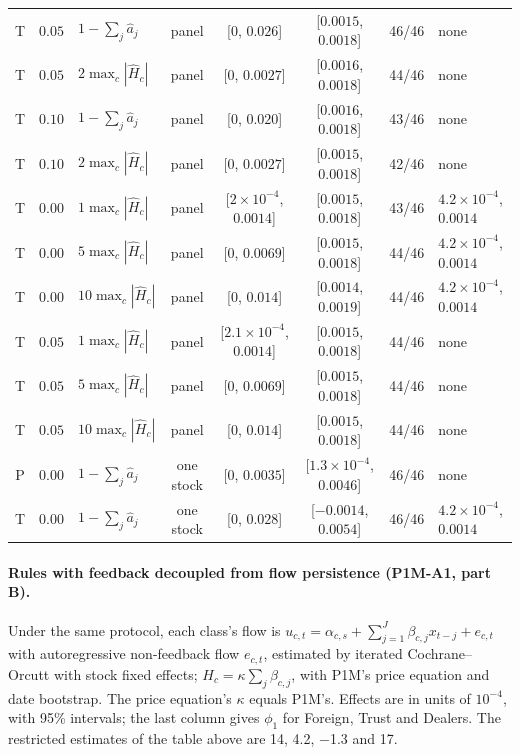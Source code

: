 \documentclass[12pt]{article}
\theoremstyle{definition}
\theoremstyle{remark}
\begin{document}
\begin{center}
\begin{tabular}{cclcccc>{\raggedright\arraybackslash}p{}}
T & $0.05$ & $1-\sum_j\hat a_j$ & panel & [$0$, $0.026$] & [$0.0015$, $0.0018$] & 46/46 & none\\
T & $0.05$ & $2\max_c|\hat H_c|$ & panel & [$0$, $0.0027$] & [$0.0016$, $0.0018$] & 44/46 & none\\
T & $0.10$ & $1-\sum_j\hat a_j$ & panel & [$0$, $0.020$] & [$0.0016$, $0.0018$] & 43/46 & none\\
T & $0.10$ & $2\max_c|\hat H_c|$ & panel & [$0$, $0.0027$] & [$0.0015$, $0.0018$] & 42/46 & none\\
T & $0.00$ & $1\max_c|\hat H_c|$ & panel & [$2\times10^{-4}$, $0.0014$] & [$0.0015$, $0.0018$] & 43/46 & $4.2\times10^{-4}$, $0.0014$\\
T & $0.00$ & $5\max_c|\hat H_c|$ & panel & [$0$, $0.0069$] & [$0.0015$, $0.0018$] & 44/46 & $4.2\times10^{-4}$, $0.0014$\\
T & $0.00$ & $10\max_c|\hat H_c|$ & panel & [$0$, $0.014$] & [$0.0014$, $0.0019$] & 44/46 & $4.2\times10^{-4}$, $0.0014$\\
T & $0.05$ & $1\max_c|\hat H_c|$ & panel & [$2.1\times10^{-4}$, $0.0014$] & [$0.0015$, $0.0018$] & 44/46 & none\\
T & $0.05$ & $5\max_c|\hat H_c|$ & panel & [$0$, $0.0069$] & [$0.0015$, $0.0018$] & 44/46 & none\\
T & $0.05$ & $10\max_c|\hat H_c|$ & panel & [$0$, $0.014$] & [$0.0015$, $0.0018$] & 44/46 & none\\
P & $0.00$ & $1-\sum_j\hat a_j$ & one stock & [$0$, $0.0035$] & [$1.3\times10^{-4}$, $0.0046$] & 46/46 & none\\
T & $0.00$ & $1-\sum_j\hat a_j$ & one stock & [$0$, $0.028$] & [$-0.0014$, $0.0054$] & 46/46 & $4.2\times10^{-4}$, $0.0014$\\
\bottomrule\end{tabular}
\end{center}


\paragraph{Rules with feedback decoupled from flow persistence (P1M-A1, part B).} Under the same protocol, each class's flow is $u_{c,t}=\alpha_{c,s}+\sum_{j=1}^{J}\beta_{c,j}x_{t-j}+e_{c,t}$ with autoregressive non-feedback flow $e_{c,t}$, estimated by iterated Cochrane--Orcutt with stock fixed effects; $H_c=\kappa\sum_j\beta_{c,j}$, with P1M's price equation and date bootstrap. The price equation's $\kappa$ equals P1M's. Effects are in units of $10^{-4}$, with 95\% intervals; the last column gives $\phi_1$ for Foreign, Trust and Dealers. The restricted estimates of the table above are 14, 4.2, $-$1.3 and 17.
\end{document}
